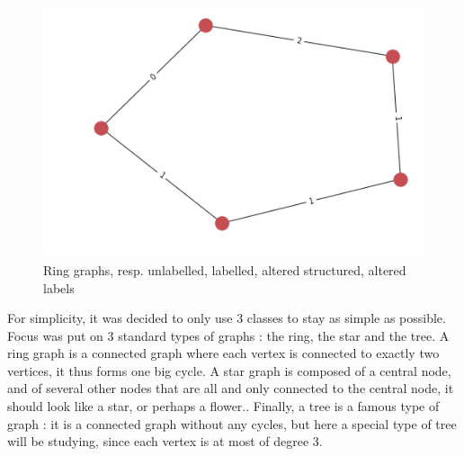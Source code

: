 \documentclass{article}
\theoremstyle{definition}
\begin{document}
\begin{figure}[!htb]
\begin{multicols}{4}
		\includegraphics[width=\linewidth]{data/generated-graphs/ring_altered_labels.png}\par
	\end{multicols}
	\caption{Ring graphs, resp. unlabelled, labelled, altered structured, altered labels}
\end{figure}
For simplicity, it was decided to only use 3 classes to stay as simple as possible. Focus was put on 3 standard types of graphs : the ring, the star and the tree. A ring graph is a connected graph where each vertex is connected to exactly two vertices, it thus forms one big cycle. A star graph is composed of a central node, and of several other nodes that are all and only connected to the central node, it should look like a star, or perhaps a flower.. Finally, a tree is a famous type of graph : it is a connected graph without any cycles, but here a special type of tree will be studying, since each vertex is at most of degree 3.\\
\end{document}
